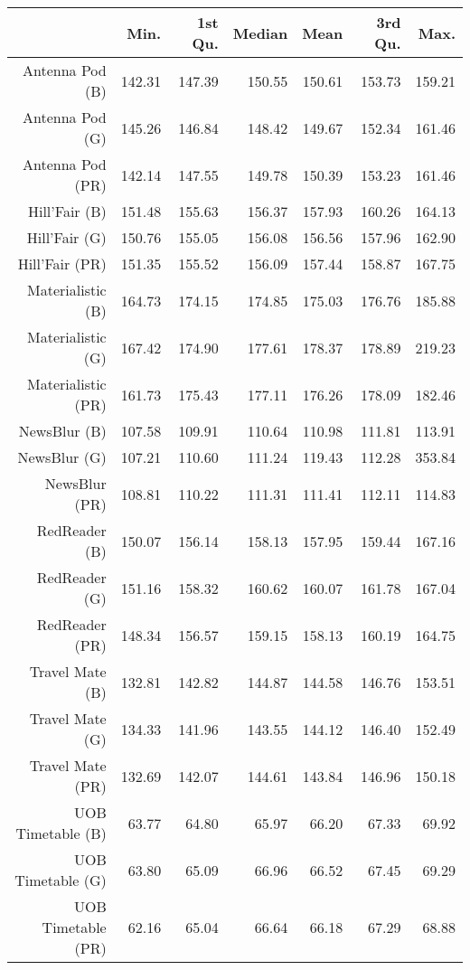 \begin{table}[ht]
\centering
\begin{tabular}{rrrrrrr}
  \hline
 & Min. & 1st Qu. & Median & Mean & 3rd Qu. & Max. \\ 
  \hline
Antenna Pod (B) & 142.31 & 147.39 & 150.55 & 150.61 & 153.73 & 159.21 \\ 
  Antenna Pod (G) & 145.26 & 146.84 & 148.42 & 149.67 & 152.34 & 161.46 \\ 
  Antenna Pod (PR) & 142.14 & 147.55 & 149.78 & 150.39 & 153.23 & 161.46 \\ 
  Hill'Fair (B) & 151.48 & 155.63 & 156.37 & 157.93 & 160.26 & 164.13 \\ 
  Hill'Fair (G) & 150.76 & 155.05 & 156.08 & 156.56 & 157.96 & 162.90 \\ 
  Hill'Fair (PR) & 151.35 & 155.52 & 156.09 & 157.44 & 158.87 & 167.75 \\ 
  Materialistic (B) & 164.73 & 174.15 & 174.85 & 175.03 & 176.76 & 185.88 \\ 
  Materialistic (G) & 167.42 & 174.90 & 177.61 & 178.37 & 178.89 & 219.23 \\ 
  Materialistic (PR) & 161.73 & 175.43 & 177.11 & 176.26 & 178.09 & 182.46 \\ 
  NewsBlur (B) & 107.58 & 109.91 & 110.64 & 110.98 & 111.81 & 113.91 \\ 
  NewsBlur (G) & 107.21 & 110.60 & 111.24 & 119.43 & 112.28 & 353.84 \\ 
  NewsBlur (PR) & 108.81 & 110.22 & 111.31 & 111.41 & 112.11 & 114.83 \\ 
  RedReader (B) & 150.07 & 156.14 & 158.13 & 157.95 & 159.44 & 167.16 \\ 
  RedReader (G) & 151.16 & 158.32 & 160.62 & 160.07 & 161.78 & 167.04 \\ 
  RedReader (PR) & 148.34 & 156.57 & 159.15 & 158.13 & 160.19 & 164.75 \\ 
  Travel Mate (B) & 132.81 & 142.82 & 144.87 & 144.58 & 146.76 & 153.51 \\ 
  Travel Mate (G) & 134.33 & 141.96 & 143.55 & 144.12 & 146.40 & 152.49 \\ 
  Travel Mate (PR) & 132.69 & 142.07 & 144.61 & 143.84 & 146.96 & 150.18 \\ 
  UOB Timetable (B) & 63.77 & 64.80 & 65.97 & 66.20 & 67.33 & 69.92 \\ 
  UOB Timetable (G) & 63.80 & 65.09 & 66.96 & 66.52 & 67.45 & 69.29 \\ 
  UOB Timetable (PR) & 62.16 & 65.04 & 66.64 & 66.18 & 67.29 & 68.88 \\ 
   \hline
\end{tabular}
\end{table}
